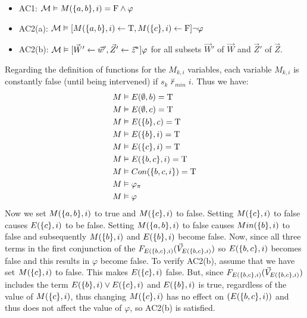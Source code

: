 \begin{example}
\begin{itemize}
        \item AC1:  $\mathcal{M} \vDash M(\{a,b\},i) = \mathrm{F} \wedge \varphi$
        \item AC2(a): $\mathcal{M}\vDash [M(\{a,b\},i)\leftarrow \mathrm{T},M(\{c\},i)\leftarrow \mathrm{F}] \neg \varphi$
        \item AC2(b): $\mathcal{M} \vDash [\vec W' \leftarrow \vec w', \vec Z' \leftarrow \vec z^* ]\varphi$
              for all subsets
              $\vec W'$ of $\vec W$ and $\vec Z'$ of $\vec Z$.
    \end{itemize}
    Regarding the definition of functions for the $M_{k,i}$ variables,
    each variable $M_{k,i}$ is constantly false (until being intervened)
    if $s_k \not \vdash_{min} i$.
    Thus we have:
    \begin{align*}
        M & \vDash E(\emptyset, b) = \mathrm{T}       \\
        M & \vDash E(\emptyset, c) = \mathrm{T}       \\
        M & \vDash E(\{b\},c) = \mathrm{T}     \\
        M & \vDash E(\{b\},i ) = \mathrm{T}    \\
        M & \vDash E(\{c\},i ) = \mathrm{T}    \\
        M & \vDash E(\{b,c\},i) = \mathrm{T}   \\
        M & \vDash Con(\{b,c,i\}) = \mathrm{T} \\
        M & \vDash \varphi_{\pi}       \\
        M & \vDash \varphi
    \end{align*}
    Now we set $M(\{a,b\},i)$ to true and $M(\{c\},i)$ to false.
    Setting $M(\{c\},i)$ to false causes $E(\{c\},i)$ to be false.
    Setting $M(\{a,b\},i)$ to false causes $Min(\{b\},i)$ to false
    and subsequently $M(\{b\},i)$ and $E(\{b\},i)$ become false.
    Now, since all three terms in the first conjunction of the $F_{E(\{b,c\},i)}(\vec V_{E(\{b,c\},i)})$
    so $E(\{b,c\},i)$ becomes false and this results in $\varphi$ become false.
    To verify AC2(b), assume that we have set $M(\{c\},i)$ to false.
    This makes $E(\{c\},i)$ false.
    But, since $F_{E(\{b,c\},i)}(\vec V_{E(\{b,c\},i)})$ includes the term
    $E(\{b\},i) \vee E(\{c\},i)$ and $E(\{b\},i)$ is true, regardless
    of the value of $M(\{c\},i)$, thus changing $M(\{c\},i)$ has
    no effect on $(E(\{b,c\},i))$ and thus does not affect
    the value of $\varphi$, so AC2(b) is satisfied.
\end{example}
